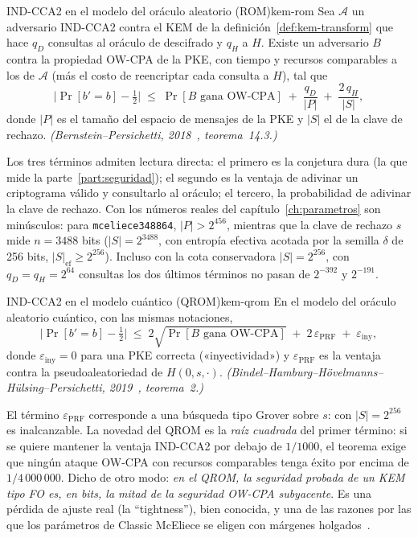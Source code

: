 \documentclass[11pt,a4paper,oneside]{report}
\begin{document}
\begin{teorema}{IND-CCA2 en el modelo del oráculo aleatorio (ROM)}{kem-rom}
Sea $\mathcal{A}$ un adversario IND-CCA2 contra el KEM de la
definición~\ref{def:kem-transform} que hace $q_D$ consultas al oráculo
de descifrado y $q_H$ a $H$. Existe un adversario $B$ contra la
propiedad OW-CPA de la PKE, con tiempo y recursos comparables a los de
$\mathcal{A}$ (más el costo de reencriptar cada consulta a $H$), tal que
\[
  \bigl|\Pr[b'=b]-\tfrac12\bigr|
  \;\le\;
  \Pr[\text{$B$ gana OW-CPA}]
  \;+\;\frac{q_D}{|P|}
  \;+\;\frac{2\,q_H}{|S|},
\]
donde $|P|$ es el tamaño del espacio de mensajes de la PKE y $|S|$ el
de la clave de rechazo. \emph{(Bernstein--Persichetti, 2018~\cite{bp2018},
teorema~14.3.)}
\end{teorema}

Los tres términos admiten lectura directa: el primero es la conjetura
dura (la que mide la parte~\ref{part:seguridad}); el segundo es la
ventaja de adivinar un criptograma válido y consultarlo al oráculo; el
tercero, la probabilidad de adivinar la clave de rechazo. Con los
números reales del capítulo~\ref{ch:parametros} son minúsculos: para
\texttt{mceliece348864}, $|P|>2^{456}$, mientras que la clave de rechazo
$s$ mide $n=3488$ bits ($|S|=2^{3488}$, con entropía efectiva acotada por
la semilla $\delta$ de 256 bits, $|S|_{\text{ef}}\ge 2^{256}$). Incluso con
la cota conservadora $|S|=2^{256}$, con $q_D=q_H=2^{64}$ consultas los dos
últimos términos no pasan de $2^{-392}$ y $2^{-191}$.

\begin{teorema}{IND-CCA2 en el modelo cuántico (QROM)}{kem-qrom}
En el modelo del oráculo aleatorio cuántico, con las mismas
notaciones,
\[
  \bigl|\Pr[b'=b]-\tfrac12\bigr|
  \;\le\;
  2\sqrt{\Pr[\text{$B$ gana OW-CPA}]}
  \;+\;2\,\varepsilon_{\mathrm{PRF}}
  \;+\;\varepsilon_{\mathrm{iny}},
\]
donde $\varepsilon_{\mathrm{iny}}=0$ para una PKE correcta
(«inyectividad») y $\varepsilon_{\mathrm{PRF}}$ es la ventaja contra la
pseudoaleatoriedad de $H(0,s,\cdot)$.
\emph{(Bindel--Hamburg--Hövelmanns--Hülsing--Persichetti,
2019~\cite{bindel2019}, teorema~2.)}
\end{teorema}

El término $\varepsilon_{\mathrm{PRF}}$ corresponde a una búsqueda
tipo Grover sobre $s$: con $|S|=2^{256}$ es inalcanzable. La novedad
del QROM es la \emph{raíz cuadrada} del primer término: si se quiere
mantener la ventaja IND-CCA2 por debajo de $1/1000$, el teorema exige
que ningún ataque OW-CPA con recursos comparables tenga éxito por
encima de $1/4\,000\,000$. Dicho de otro modo: \emph{en el QROM, la
seguridad probada de un KEM tipo FO es, en bits, la mitad de la
seguridad OW-CPA subyacente}. Es una pérdida de ajuste real (la
``tightness''), bien conocida, y una de las razones por las que los
parámetros de Classic McEliece se eligen con márgenes
holgados~\cite{cmsecurity}.
\end{document}
